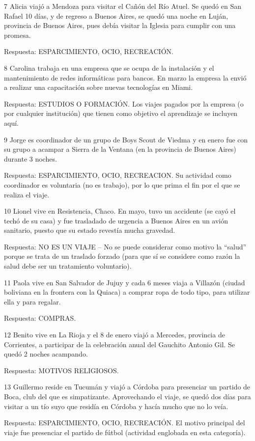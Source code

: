 \documentclass[
  openany]{book}
\begin{document}
7 Alicia viajó a Mendoza para visitar el Cañón del Río Atuel. Se quedó en San Rafael 10 días, y de regreso a Buenos Aires, se quedó una noche en Luján, provincia de Buenos Aires, pues debía visitar la Iglesia para cumplir con una promesa.

Respuesta: ESPARCIMIENTO, OCIO, RECREACIÓN.

8 Carolina trabaja en una empresa que se ocupa de la instalación y el mantenimiento de redes informáticas para bancos. En marzo la empresa la envió a realizar una capacitación sobre nuevas tecnologías en Miami.

Respuesta: ESTUDIOS O FORMACIÓN. Los viajes pagados por la empresa (o por cualquier institución) que tienen como objetivo el aprendizaje se incluyen aquí.

9 Jorge es coordinador de un grupo de Boys Scout de Viedma y en enero fue con su grupo a acampar a Sierra de la Ventana (en la provincia de Buenos Aires) durante 3 noches.

Respuesta: ESPARCIMIENTO, OCIO, RECREACION. Su actividad como coordinador es voluntaria (no es trabajo), por lo que prima el fin por el que se realiza el viaje.

10 Lionel vive en Resistencia, Chaco. En mayo, tuvo un accidente (se cayó el techó de su casa) y fue trasladado de urgencia a Buenos Aires en un avión sanitario, puesto que su estado revestía mucha gravedad.

Respuesta: NO ES UN VIAJE -- No se puede considerar como motivo la ``salud'' porque se trata de un traslado forzado (para que sí se considere como razón la salud debe ser un tratamiento voluntario).

11 Paola vive en San Salvador de Jujuy y cada 6 meses viaja a Villazón (ciudad boliviana en la frontera con la Quiaca) a comprar ropa de todo tipo, para utilizar ella y para regalar.

Respuesta: COMPRAS.

12 Benito vive en La Rioja y el 8 de enero viajó a Mercedes, provincia de Corrientes, a participar de la celebración anual del Gauchito Antonio Gil. Se quedó 2 noches acampando.

Respuesta: MOTIVOS RELIGIOSOS.

13 Guillermo reside en Tucumán y viajó a Córdoba para presenciar un partido de Boca, club del que es simpatizante. Aprovechando el viaje, se quedó dos días para visitar a un tío suyo que residía en Córdoba y hacía mucho que no lo veía.

Respuesta: ESPARCIMIENTO, OCIO, RECREACIÓN. El motivo principal del viaje fue presenciar el partido de fútbol (actividad englobada en esta categoría).
\end{document}
